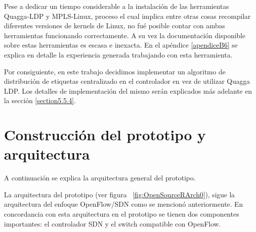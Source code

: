 Pese a dedicar un tiempo considerable a la instalaci\'on de las herramientas Quagga-LDP y MPLS-Linux, proceso el cual implica entre otras cosas recompilar diferentes versiones de kernels de Linux, no fu\'e posible contar con ambas herramientas funcionando correctamente. A su vez la documentaci\'on disponible sobre estas herramientas es escasa e inexacta. En el apéndice \ref{apendiceB6} se explica en detalle la experiencia generada trabajando con esta herramienta.



Por consiguiente, en este trabajo decidimos implementar un algoritmo de distribución de etiquetas centralizado en el controlador en vez de utilizar Quagga LDP. Los detalles de implementaci\'on del mismo ser\'an explicados m\'as adelante en la sección \ref{section5.5.4}.\\

\section{Construcci\'on del prototipo y arquitectura}

A continuación se explica la arquitectura general del prototipo. 

La arquitectura del prototipo (ver figura ~\ref{fig:OpenSourceRArch0}), sigue la arquitectura del enfoque OpenFlow/SDN como se mencion\'o anteriormente. En concordancia con esta arquitectura en el prototipo se tienen dos componentes importantes: el controlador SDN y el switch compatible con OpenFlow.\\

